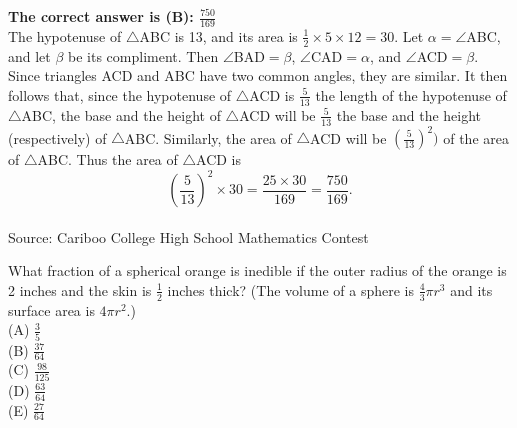 \documentclass{article}
\begin{document}
\textbf{The correct answer is (B): $\frac{750}{169}$}\\[1ex]
The hypotenuse of $\triangle$ABC is 13, and its area is $\frac{1}{2}\times5\times12=30$. Let $\alpha=\angle$ABC, and let $\beta$ be its compliment. Then $\angle$BAD$=\beta$, $\angle$CAD$=\alpha$, and $\angle$ACD$=\beta$. Since triangles ACD and ABC have two common angles, they are similar. It then follows that, since the hypotenuse of $\triangle$ACD is $\frac{5}{13}$ the length of the hypotenuse of $\triangle$ABC, the base and the height of $\triangle$ACD will be $\frac{5}{13}$ the base and the height (respectively) of $\triangle$ABC. Similarly, the area of $\triangle$ACD will be $(\frac{5}{13})^2)$ of the area of $\triangle$ABC. Thus the area of $\triangle$ACD is
\begin{equation*}
(\frac{5}{13})^{2}\times30=\frac{25\times30}{169}=\frac{750}{169}.
\end{equation*}
\\[5 ex]

\scriptsize
Source: Cariboo College High School Mathematics Contest

\normalsize
What fraction of a spherical orange is inedible if the outer radius of the orange is 2 inches and the skin is $\frac{1}{2}$ inches thick? (The volume of a sphere is $\frac{4}{3}\pi r^3$ and its surface area is $4\pi r^2$.)\\
(A) $\frac{3}{5}$\\[1 ex]
(B) $\frac{37}{64}$\\[1 ex]
(C) $\frac{98}{125}$\\[1 ex]
(D) $\frac{63}{64}$\\[1 ex]
(E) $\frac{27}{64}$\\

\end{document}

